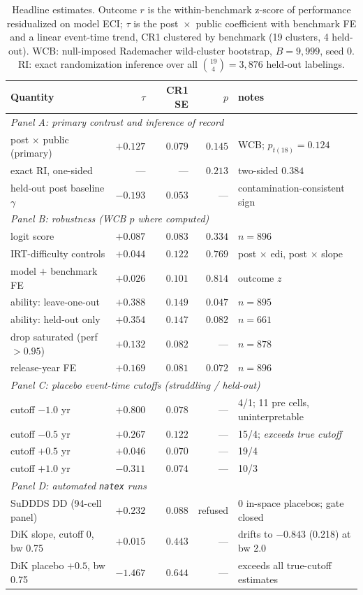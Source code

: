 \documentclass[11pt]{article}
\newcommand{\natex}{\texttt{natex}}
\begin{document}
\begin{table}[t]
\centering
\small
\caption{Headline estimates. Outcome $r$ is the within-benchmark z-score of
performance residualized on model ECI; $\tau$ is the post~$\times$~public
coefficient with benchmark FE and a linear event-time trend, CR1 clustered
by benchmark (19 clusters, 4 held-out). WCB: null-imposed Rademacher
wild-cluster bootstrap, $B=9{,}999$, seed 0. RI: exact randomization
inference over all $\binom{19}{4}=3{,}876$ held-out labelings.}
\label{tab:main}
\begin{tabular}{lrrrl}
\toprule
Quantity & $\tau$ & CR1 SE & $p$ & notes \\
\midrule
\multicolumn{5}{l}{\emph{Panel A: primary contrast and inference of record}}\\
post $\times$ public (primary) & $+0.127$ & $0.079$ & $0.145$ & WCB; $p_{t(18)}=0.124$ \\
\quad exact RI, one-sided      & ---      & ---     & $0.213$ & two-sided $0.384$ \\
held-out post baseline $\gamma$ & $-0.193$ & $0.053$ & --- & contamination-consistent sign \\
\midrule
\multicolumn{5}{l}{\emph{Panel B: robustness (WCB $p$ where computed)}}\\
logit score                 & $+0.087$ & $0.083$ & $0.334$ & $n=896$ \\
IRT-difficulty controls     & $+0.044$ & $0.122$ & $0.769$ & post $\times$ edi, post $\times$ slope \\
model $+$ benchmark FE      & $+0.026$ & $0.101$ & $0.814$ & outcome $z$ \\
ability: leave-one-out      & $+0.388$ & $0.149$ & $0.047$ & $n=895$ \\
ability: held-out only      & $+0.354$ & $0.147$ & $0.082$ & $n=661$ \\
drop saturated (perf $>0.95$) & $+0.132$ & $0.082$ & --- & $n=878$ \\
release-year FE             & $+0.169$ & $0.081$ & $0.072$ & $n=896$ \\
\midrule
\multicolumn{5}{l}{\emph{Panel C: placebo event-time cutoffs (straddling / held-out)}}\\
cutoff $-1.0$ yr & $+0.800$ & $0.078$ & --- & 4/1; 11 pre cells, uninterpretable \\
cutoff $-0.5$ yr & $+0.267$ & $0.122$ & --- & 15/4; \emph{exceeds true cutoff} \\
cutoff $+0.5$ yr & $+0.046$ & $0.070$ & --- & 19/4 \\
cutoff $+1.0$ yr & $-0.311$ & $0.074$ & --- & 10/3 \\
\midrule
\multicolumn{5}{l}{\emph{Panel D: automated \natex{} runs}}\\
SuDDDS DD (94-cell panel) & $+0.232$ & $0.088$ & refused & 0 in-space placebos; gate closed \\
DiK slope, cutoff 0, bw 0.75 & $+0.015$ & $0.443$ & --- & drifts to $-0.843$ (0.218) at bw 2.0 \\
DiK placebo $+0.5$, bw 0.75 & $-1.467$ & $0.644$ & --- & exceeds all true-cutoff estimates \\
\bottomrule
\end{tabular}


\end{table}
\end{document}
